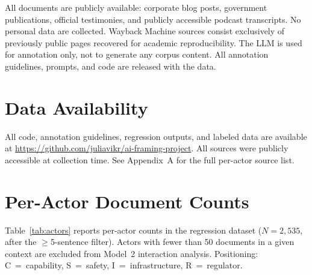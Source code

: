 \documentclass[11pt,a4paper,twocolumn]{article}
\begin{document}
All documents are publicly available: corporate blog posts, government
publications, official testimonies, and publicly accessible podcast transcripts.
No personal data are collected. Wayback Machine sources consist exclusively of
previously public pages recovered for academic reproducibility. The LLM is used
for annotation only, not to generate any corpus content. All annotation
guidelines, prompts, and code are released with the data.


\section*{Data Availability}

All code, annotation guidelines, regression outputs, and labeled data are
available at \url{https://github.com/juliavikr/ai-framing-project}. All
sources were publicly accessible at collection time. See Appendix~A for the
full per-actor source list.





\appendix
\section{Per-Actor Document Counts}
\label{app:actors}

Table~\ref{tab:actors} reports per-actor counts in the regression dataset
($N = 2{,}535$, after the $\geq$5-sentence filter). Actors with fewer than
50 documents in a given context are excluded from Model~2 interaction analysis.
Positioning: C~=~capability, S~=~safety, I~=~infrastructure, R~=~regulator.
\end{document}
